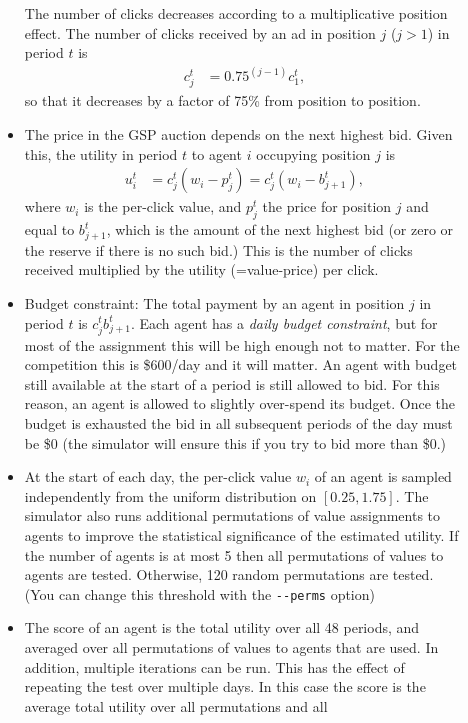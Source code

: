 \documentclass[11pt]{article}
\begin{document}
\begin{description}
\begin{itemize}
The number of clicks decreases according to a multiplicative
position effect. The number of clicks received by an ad in
position $j$ ($j>1$) in period $t$ is
%
\begin{align}
c_j^t &= 0.75^{(j-1)}c_1^t,
\end{align}
%
so that it decreases by a factor of 75\% from  position to position.
%
\item The price in the GSP auction depends on the next highest bid.
Given this, the utility in period $t$ to
agent $i$ occupying position $j$ 
is 
%
%
\begin{align}
u_i^t &=  c^t_j(w_i - p^t_j) = c^t_j(w_i - b^t_{j+1}),
\end{align}
%
where $w_i$ is the per-click value,
and $p^t_j$ the
price for position $j$ and equal
to $b^t_{j+1}$, which
is the amount of the next highest 
bid (or zero
or the reserve if there
is no such bid.) 
This is the number of clicks received multiplied by the
utility (=value-price) per click.
%
%				
\item Budget constraint: The total payment by an agent in position $j$
  in period $t$ is $c_j^t b^t_{j+1}$. Each agent has a {\em daily
    budget constraint}, but for most of the assignment this will be
  high enough not to matter. For the competition this is \$600/day and
  it will matter.
 An agent  with budget still available at the start
of a period is still allowed to bid. For this reason, an
agent  is allowed to slightly over-spend its budget.
Once the budget is exhausted the 
bid in all 
subsequent periods  of the day 
must be \$0 (the
  simulator will ensure this if you try to bid more than \$0.)
%				
\item At the start of each day, the per-click value $w_i$ of an agent
  is sampled independently from the uniform distribution on
  $[0.25,1.75]$.  The simulator also runs additional permutations of
  value assignments to agents to improve the statistical
  significance of the estimated utility.
If the number of agents is at most 5 then 
all permutations 
 of values to agents 
are tested. Otherwise,
  120 random permutations are tested. (You can change this threshold
  with the \verb+--perms+ option)
%
%
\item The score of an agent is the total utility over all 48 periods,
  and averaged over all permutations of values to agents that are
  used.  In addition, multiple iterations can be run. This has the
  effect of repeating the test over multiple days.  In this case the
  score is the average total utility over all permutations and all

\end{itemize}
\end{description}
\end{document}
